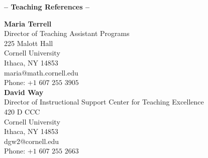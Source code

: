 \documentclass[a4paper]{article}
\def\tit#1{\medskip \begin{center}  {\Large {\bf -- #1 -- }} \end{center}}
\begin{document}
\tit{Teaching References}

{\bf Maria Terrell}\\
 Director of Teaching Assistant Programs\\
 	 225 Malott Hall \\
	 Cornell University\\
	 Ithaca, NY 14853\\
	 maria@math.cornell.edu\\
Phone: +$1$  $607$ $255$ $3905$\\


{\bf David Way}\\
Director of Instructional Support
Center for Teaching Excellence\\
420 D CCC\\
Cornell University\\
Ithaca, NY 14853\\
dgw2@cornell.edu\\
Phone: +$1$ $607$ $255$ $2663$\\
\end{document}
